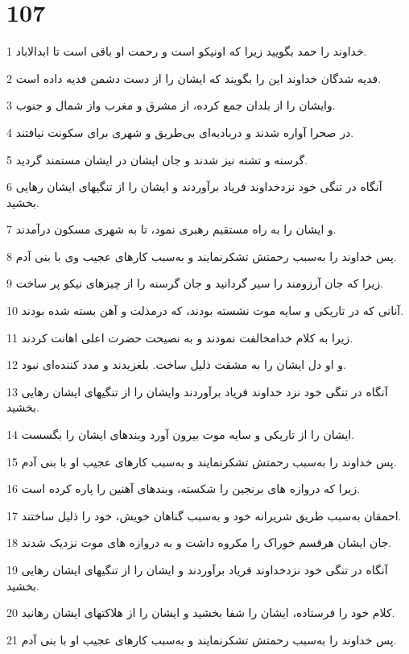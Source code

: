\chapter{107}

\par 1 خداوند را حمد بگویید زیرا که اونیکو است و رحمت او باقی است تا ابدالاباد.
\par 2 فدیه شدگان خداوند این را بگویند که ایشان را از دست دشمن فدیه داده است.
\par 3 وایشان را از بلدان جمع کرده، از مشرق و مغرب واز شمال و جنوب.
\par 4 در صحرا آواره شدند و دربادیه‌ای بی‌طریق و شهری برای سکونت نیافتند.
\par 5 گرسنه و تشنه نیز شدند و جان ایشان در ایشان مستمند گردید.
\par 6 آنگاه در تنگی خود نزدخداوند فریاد برآوردند و ایشان را از تنگیهای ایشان رهایی بخشید.
\par 7 و ایشان را به راه مستقیم رهبری نمود، تا به شهری مسکون درآمدند. 
\par 8 پس خداوند را به‌سبب رحمتش تشکرنمایند و به‌سبب کارهای عجیب وی با بنی آدم.
\par 9 زیرا که جان آرزومند را سیر گردانید و جان گرسنه را از چیزهای نیکو پر ساخت.
\par 10 آنانی که در تاریکی و سایه موت نشسته بودند، که درمذلت و آهن بسته شده بودند.
\par 11 زیرا به کلام خدامخالفت نمودند و به نصیحت حضرت اعلی اهانت کردند.
\par 12 و او دل ایشان را به مشقت ذلیل ساخت. بلغزیدند و مدد کننده‌ای نبود.
\par 13 آنگاه در تنگی خود نزد خداوند فریاد برآوردند وایشان را از تنگیهای ایشان رهایی بخشید.
\par 14 ایشان را از تاریکی و سایه موت بیرون آورد وبندهای ایشان را بگسست.
\par 15 پس خداوند را به‌سبب رحمتش تشکرنمایند و به‌سبب کارهای عجیب او با بنی آدم.
\par 16 زیرا که دروازه های برنجین را شکسته، وبندهای آهنین را پاره کرده است.
\par 17 احمقان به‌سبب طریق شریرانه خود و به‌سبب گناهان خویش، خود را ذلیل ساختند.
\par 18 جان ایشان هرقسم خوراک را مکروه داشت و به دروازه های موت نزدیک شدند.
\par 19 آنگاه در تنگی خود نزدخداوند فریاد برآوردند و ایشان را از تنگیهای ایشان رهایی بخشید.
\par 20 کلام خود را فرستاده، ایشان را شفا بخشید و ایشان را از هلاکتهای ایشان رهانید.
\par 21 پس خداوند را به‌سبب رحمتش تشکرنمایند و به‌سبب کارهای عجیب او با بنی آدم.
